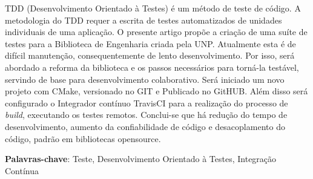 \documentclass[
	article,			%
	12pt,				%
	oneside,			%
	a4paper,			%
	english,			
	brazil,
	sumario=tradicional
	]{abntex2}
\begin{document}

\frenchspacing 


%
%
\maketitle

\begin{resumoumacoluna}
TDD (Desenvolvimento Orientado à Testes) é um método de teste de código. A metodologia do TDD requer a escrita de testes automatizados de unidades individuais de uma aplicação.
O presente artigo propõe a criação de uma suíte de testes para a Biblioteca de Engenharia criada pela UNP. Atualmente esta é de difícil manutenção, consequentemente de lento desenvolvimento. Por isso, será abordado a reforma da biblioteca e os passos necessários para torná-la testável, servindo de base para desenvolvimento colaborativo. Será iniciado um novo projeto com CMake, versionado no GIT e Publicado no GitHUB. Além disso será configurado o Integrador contínuo TravisCI para a realização do processo de \textit{build}, executando os testes remotos. Conclui-se que há redução do tempo de desenvolvimento, aumento da confiabilidade de código e desacoplamento do código, padrão em bibliotecas opensource.

 \vspace{\onelineskip}
 
 \noindent
 \textbf{Palavras-chave}: Teste, Desenvolvimento Orientado à Testes, Integração Contínua
\end{resumoumacoluna}
\end{document}

